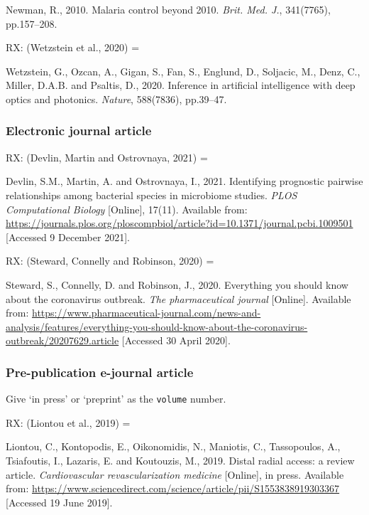 Newman, R., 2010. Malaria control beyond 2010. \emph{Brit. Med. J.}, 341(7765), pp.157--208.


RX: (Wetzstein et al., 2020) = \cite{wetzstein.etal2020iai}

Wetzstein, G., Ozcan, A., Gigan, S., Fan, S., Englund, D., Soljacic, M., Denz, C., Miller, D.A.B. and Psaltis, D., 2020. Inference in artificial intelligence with deep optics and photonics. \emph{Nature}, 588(7836), pp.39--47.



\subsubsection*{Electronic journal article}

RX: (Devlin, Martin and Ostrovnaya, 2021) = \cite{devlin.etal2021ipp}

Devlin, S.M., Martin, A. and Ostrovnaya, I., 2021. Identifying prognostic pairwise relationships among bacterial species in microbiome studies. \emph{PLOS Computational Biology} [Online], 17(11). Available from: \url{https://journals.plos.org/ploscompbiol/article?id=10.1371/journal.pcbi.1009501} [Accessed 9 December 2021].


RX: (Steward, Connelly and Robinson, 2020) = \cite{steward.etal2020eys}

Steward, S., Connelly, D. and Robinson, J., 2020. Everything you should know about the coronavirus outbreak. \emph{The pharmaceutical journal} [Online]. Available from: \url{https://www.pharmaceutical-journal.com/news-and-analysis/features/everything-you-should-know-about-the-coronavirus-outbreak/20207629.article} [Accessed 30 April 2020].



\subsubsection*{Pre-publication e-journal article}

Give `in press' or `preprint' as the \texttt{volume} number.

RX: (Liontou et al., 2019) = \cite{liontou.etal2019dra}

Liontou, C., Kontopodis, E., Oikonomidis, N., Maniotis, C., Tassopoulos, A., Tsiafoutis, I., Lazaris, E. and Koutouzis, M., 2019. Distal radial access: a review article. \emph{Cardiovascular revascularization medicine} [Online], in press. Available from: \url{https://www.sciencedirect.com/science/article/pii/S1553838919303367} [Accessed 19 June 2019].




